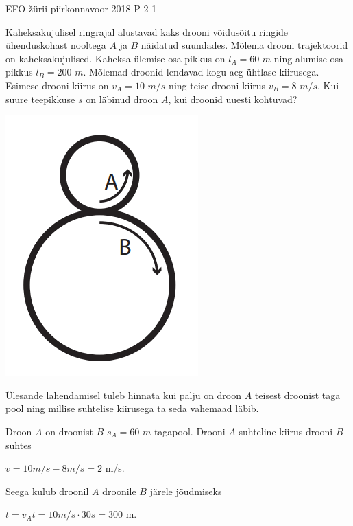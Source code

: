 {EFO žürii} %
{piirkonnavoor} %
{2018} %
{P 2} %
{1} %
{

\ifStatement
 Kaheksakujulisel ringrajal alustavad kaks drooni võidusõitu ringide ühenduskohast nooltega $A$ ja $B$ näidatud suundades. Mõlema drooni trajektoorid on kaheksakujulised. Kaheksa ülemise osa pikkus on $l_A = 60$ $m$ ning alumise osa pikkus $l_B = 200$ $m$. Mõlemad droonid lendavad kogu aeg ühtlase kiirusega. Esimese drooni kiirus on $v_A = 10$ $m/s$ ning teise drooni kiirus $v_B = 8$ $m/s$. Kui suure teepikkuse $s$ on läbinud droon $A$, kui droonid uuesti kohtuvad? 
\begin{center}
	\includegraphics[width=0.5\linewidth]{2018-v2p-02-yl.PNG}
\end{center}
\fi

\ifHint
Ülesande lahendamisel tuleb hinnata kui palju on droon $A$ teisest droonist taga pool ning millise suhtelise kiirusega ta seda vahemaad läbib.
\fi

\ifSolution
Droon $A$ on droonist $B$ $s_A = 60$ $m$ tagapool. Drooni $A$ suhteline kiirus drooni $B$ suhtes
\begin{center}
$v = 10 m/s - 8 m/s = 2$ m/s.
\end{center}
Seega kulub droonil $A$ droonile $B$ järele jõudmiseks
\begin{center}
$t = v_A t = 10 m/s \cdot 30 s = 300$ m.
\end{center}
\fi
}
